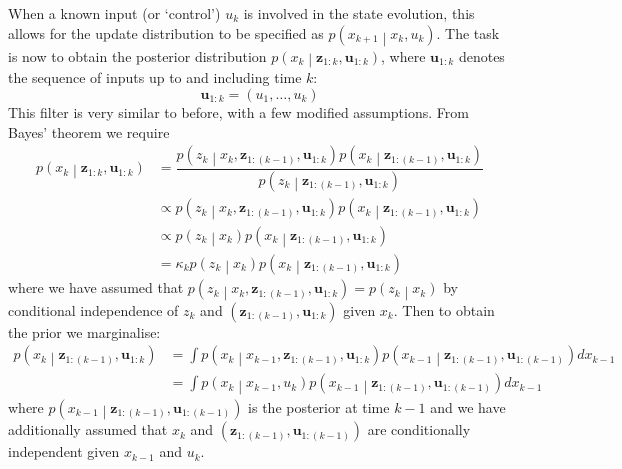 \documentclass[11pt]{report} %
\begin{document}
When a known input (or `control') $u_{k}$ is involved in the state evolution, this allows for the update distribution to be specified as $p\left(x_{k + 1}\middle|x_{k}, u_{k}\right)$. The task is now to obtain the posterior distribution $p\left(x_{k}\middle|\mathbf{z}_{1:k}, \mathbf{u}_{1:k}\right)$, where $\mathbf{u}_{1:k}$ denotes the sequence of inputs up to and including time $k$:
\begin{equation}
\mathbf{u}_{1:k} = \left(u_{1}, \dots, u_{k}\right)
\end{equation}
This filter is very similar to before, with a few modified assumptions. From Bayes' theorem we require
\begin{align}
p\left(x_{k}\middle|\mathbf{z}_{1:k}, \mathbf{u}_{1:k}\right) &= \dfrac{p\left(z_{k}\middle|x_{k}, \mathbf{z}_{1:\left(k - 1\right)}, \mathbf{u}_{1:k}\right)p\left(x_{k}\middle|\mathbf{z}_{1:\left(k - 1\right)}, \mathbf{u}_{1:k}\right)}{p\left(z_{k}\middle|\mathbf{z}_{1:\left(k - 1\right)}, \mathbf{u}_{1:k}\right)} \\
&\propto p\left(z_{k}\middle|x_{k}, \mathbf{z}_{1:\left(k - 1\right)}, \mathbf{u}_{1:k}\right)p\left(x_{k}\middle|\mathbf{z}_{1:\left(k - 1\right)}, \mathbf{u}_{1:k}\right) \\
&\propto p\left(z_{k}\middle|x_{k}\right)p\left(x_{k}\middle|\mathbf{z}_{1:\left(k - 1\right)}, \mathbf{u}_{1:k}\right) \\
&= \kappa_{k} p\left(z_{k}\middle|x_{k}\right)p\left(x_{k}\middle|\mathbf{z}_{1:\left(k - 1\right)}, \mathbf{u}_{1:k}\right)
\end{align}
where we have assumed that $p\left(z_{k}\middle|x_{k}, \mathbf{z}_{1:\left(k - 1\right)}, \mathbf{u}_{1:k}\right) = p\left(z_{k}\middle|x_{k}\right)$ by conditional independence of $z_{k}$ and $\left(\mathbf{z}_{1:\left(k - 1\right)}, \mathbf{u}_{1:k}\right)$ given $x_{k}$. Then to obtain the prior we marginalise:
\begin{align}
p\left(x_{k}\middle|\mathbf{z}_{1:\left(k - 1\right)}, \mathbf{u}_{1:k}\right) &= \int p\left(x_{k}\middle|x_{k - 1}, \mathbf{z}_{1:\left(k - 1\right)}, \mathbf{u}_{1:k}\right)p\left(x_{k - 1}\middle|\mathbf{z}_{1:\left(k - 1\right)}, \mathbf{u}_{1:\left(k - 1\right)}\right)dx_{k - 1} \\
&= \int p\left(x_{k}\middle|x_{k - 1}, u_{k}\right)p\left(x_{k - 1}\middle|\mathbf{z}_{1:\left(k - 1\right)}, \mathbf{u}_{1:\left(k - 1\right)}\right)dx_{k - 1}
\end{align}
where $p\left(x_{k - 1}\middle|\mathbf{z}_{1:\left(k - 1\right)}, \mathbf{u}_{1:\left(k - 1\right)}\right)$ is the posterior at time $k - 1$ and we have additionally assumed that $x_{k}$ and $\left(\mathbf{z}_{1:\left(k - 1\right)}, \mathbf{u}_{1:\left(k - 1\right)}\right)$ are conditionally independent given $x_{k - 1}$ and $u_{k}$.
\end{document}
